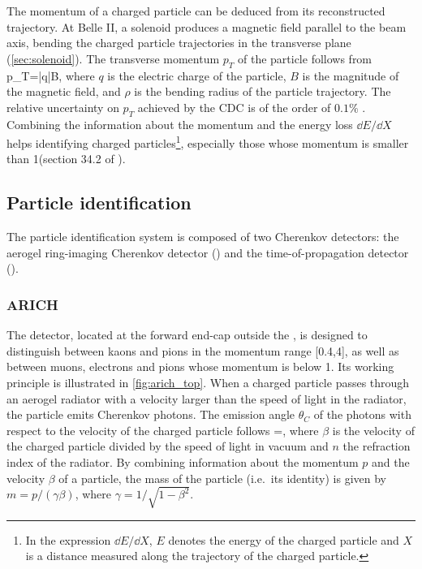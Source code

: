 The momentum of a charged particle can be deduced from its reconstructed trajectory.
At Belle II, a solenoid produces a magnetic field parallel to the beam axis, bending the charged particle trajectories in the transverse plane (\cref{sec:solenoid}).
The transverse momentum $p_T$ of the particle follows from
\be \label{eq:momentum_vs_curvature}
p_T=|q|B\rho,
\ee
where $q$ is the electric charge of the particle, $B$ is the magnitude of the magnetic field, and $\rho$ is the bending radius of the particle trajectory.
The relative uncertainty on $p_T$ achieved by the CDC is of the order of $0.1\%$ \cite{Dong:2019wtj}.
Combining the information about the momentum and the energy loss $\dd E/\dd X$ helps identifying charged particles\footnote{In the expression $\dd E/\dd X$, $E$ denotes the energy of the charged particle and $X$ is a distance measured along the trajectory of the charged particle.}, especially those whose momentum is smaller than 1\gevc (section 34.2 of \cite{ParticleDataGroup:2020ssz}).

\subsection{Particle identification}
The particle identification system is composed of two Cherenkov detectors: the aerogel ring-imaging Cherenkov detector (\ARICH) and the time-of-propagation detector (\TOP).
\subsubsection*{ARICH}
The \ARICH detector, located at the forward end-cap outside the \CDC, is designed to distinguish between kaons and pions in the momentum range [0.4,4]\gevc, as well as between muons, electrons and pions whose momentum is below 1\gevc.
Its working principle is illustrated in \cref{fig:arich_top}.
When a charged particle passes through an aerogel radiator with a velocity larger than the speed of light in the radiator, the particle emits Cherenkov photons.
The emission angle $\theta_C$ of the photons with respect to the velocity of the charged particle follows
\be \label{eq:velocity}
\beta=,
\ee
where $\beta$ is the velocity of the charged particle divided by the speed of light in vacuum and $n$ the refraction index of the radiator.
By combining information about the momentum $p$ and the velocity $\beta$ of a particle, the mass of the particle (i.e.~its identity) is given by $m=p/(\gamma\beta)$, where $\gamma=1/\sqrt{1-\beta^2}$.
